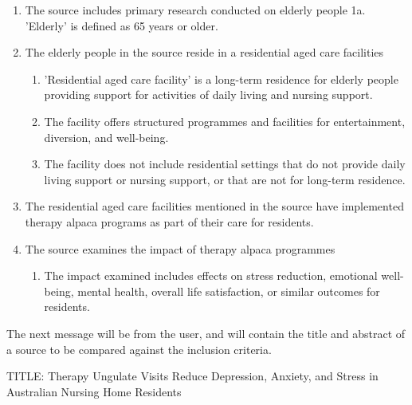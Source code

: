 \documentclass{article}
\begin{document}
\begin{description}
  \GPT \begin{enumerate}[label=\arabic*.\ ]
    \item The source includes primary research conducted on elderly people 1a.
    'Elderly' is defined as 65 years or older. 
    \item The elderly people in the source reside in a residential aged care
    facilities 
      \begin{enumerate}[label=\arabic{enumi}\alph*.\ ]
        \item 'Residential aged care facility' is a long-term residence for
        elderly people providing support for activities of daily living and
        nursing support. 
        \item The facility offers structured programmes and facilities for
        entertainment, diversion, and well-being. 
        \item The facility does not include residential settings that do not
        provide daily living support or nursing support, or that are not for
        long-term residence. 
      \end{enumerate}
    \item The residential aged care facilities mentioned in the source have
    implemented therapy alpaca programs as part of their care for residents. 
    \item The source examines the impact of therapy alpaca programmes 
      \begin{enumerate}[label=\arabic{enumi}\alph*.\ ]
        \item The impact examined includes effects on stress reduction,
        emotional well-being, mental health, overall life satisfaction, or
        similar outcomes for residents.
      \end{enumerate}
    \end{enumerate}

  \System The next message will be from the user, and will contain the title
  and abstract of a source to be compared against the inclusion criteria.

  \User TITLE: Therapy Ungulate Visits Reduce Depression, Anxiety, and Stress
  in Australian Nursing Home Residents


\end{description}
\end{document}
